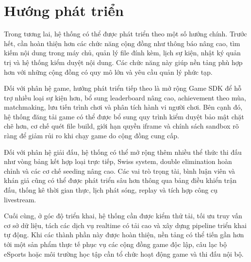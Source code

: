 \documentclass[../DoAn.tex]{subfiles}
\begin{document}
\section{Hướng phát triển}

Trong tương lai, hệ thống có thể được phát triển theo một số hướng chính. Trước hết, cần hoàn thiện hơn các chức năng cộng đồng như thông báo nâng cao, tìm kiếm nội dung trong máy chủ, quản lý file đính kèm, lịch sự kiện, nhật ký quản trị và hệ thống kiểm duyệt nội dung. Các chức năng này giúp nền tảng phù hợp hơn với những cộng đồng có quy mô lớn và yêu cầu quản lý phức tạp.

Đối với phân hệ game, hướng phát triển tiếp theo là mở rộng Game SDK để hỗ trợ nhiều loại sự kiện hơn, bổ sung leaderboard nâng cao, achievement theo mùa, matchmaking, lưu tiến trình chơi và phân tích hành vi người chơi. Bên cạnh đó, hệ thống đăng tải game có thể được bổ sung quy trình kiểm duyệt bảo mật chặt chẽ hơn, cơ chế quét file build, giới hạn quyền iframe và chính sách sandbox rõ ràng để giảm rủi ro khi chạy game do cộng đồng cung cấp.

Đối với phân hệ giải đấu, hệ thống có thể mở rộng thêm nhiều thể thức thi đấu như vòng bảng kết hợp loại trực tiếp, Swiss system, double elimination hoàn chỉnh và các cơ chế seeding nâng cao. Các vai trò trọng tài, bình luận viên và khán giả cũng có thể được phát triển sâu hơn thông qua bảng điều khiển trận đấu, thống kê thời gian thực, lịch phát sóng, replay và tích hợp công cụ livestream.

Cuối cùng, ở góc độ triển khai, hệ thống cần được kiểm thử tải, tối ưu truy vấn cơ sở dữ liệu, tách các dịch vụ realtime có tải cao và xây dựng pipeline triển khai tự động. Khi các thành phần này được hoàn thiện, nền tảng có thể tiến gần hơn tới một sản phẩm thực tế phục vụ các cộng đồng game độc lập, câu lạc bộ eSports hoặc môi trường học tập cần tổ chức hoạt động game và thi đấu nội bộ.
\end{document}
